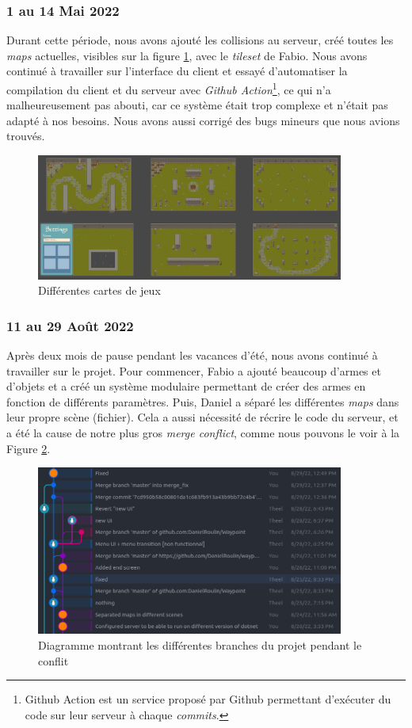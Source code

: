 \documentclass[a4paper]{article}
\begin{document}
\subsubsection{1 au 14 Mai 2022}
Durant cette période, nous avons ajouté les collisions au serveur, créé toutes les \textit{maps} actuelles, visibles sur la figure \ref{fig:maps}, avec le \textit{tileset} \cite{tileset} de Fabio. Nous avons continué à travailler sur l'interface du client et essayé d'automatiser la compilation du client et du serveur avec \textit{Github Action}\footnote{Github Action est un service proposé par Github permettant d'exécuter du code sur leur serveur à chaque \textit{commits}.},  ce qui n'a malheureusement pas abouti, car ce système était trop complexe et n'était pas adapté à nos besoins. Nous avons aussi corrigé des bugs mineurs que nous avions trouvés.

\begin{figure}
	\centering
    \includegraphics[width=0.9\textwidth]{images/game/maps.png}
    \caption{Différentes cartes de jeux}
    \label{fig:maps}
\end{figure}


\subsubsection{11 au 29 Août 2022}
Après deux mois de pause pendant les vacances d'été, nous avons continué à travailler sur le projet. Pour commencer, Fabio a ajouté beaucoup d'armes et d'objets et a créé un système modulaire permettant de créer des armes en fonction de différents paramètres. Puis, Daniel a séparé les différentes \textit{maps} dans leur propre scène (fichier). Cela a aussi nécessité de récrire le code du serveur, et a été la cause de notre plus gros \textit{merge conflict}, comme nous pouvons le voir à la Figure \ref{fig:conflict}.

\begin{figure}
	\centering
    \includegraphics[width=0.9\textwidth]{images/conflict.png}
    \caption{Diagramme montrant les différentes branches du projet pendant le conflit}
    \label{fig:conflict}
\end{figure}
\end{document}
